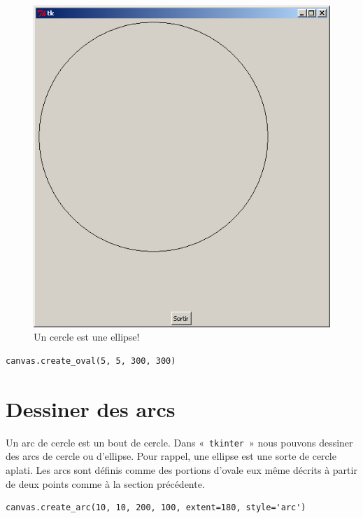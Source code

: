 \begin{figure}[h!]
\centering
\includegraphics[scale=0.4]{images/cerclebis}
\caption{Un cercle est une ellipse!}\label{fig:cerclebis}
\end{figure}

\begin{Verbatim}[frame=single,rulecolor=\color{mbleu}, label=à taper]
canvas.create_oval(5, 5, 300, 300)
\end{Verbatim}

\section{Dessiner des arcs}
Un arc de cercle est un bout de cercle. Dans « \texttt{tkinter} » nous pouvons dessiner des arcs de cercle ou d'ellipse. Pour rappel, une ellipse est une sorte de cercle aplati. 
Les arcs sont définis comme des portions d'ovale eux même décrits à partir de deux points comme à la section précédente.

\begin{Verbatim}[frame=single,rulecolor=\color{mbleu}, label=à taper]
canvas.create_arc(10, 10, 200, 100, extent=180, style='arc')
\end{Verbatim}



